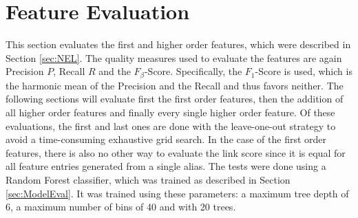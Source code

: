 \section{Feature Evaluation}
\label{sec:FeatureEval}
This section evaluates the first and higher order features, which were described in Section \ref{sec:NEL}. The quality measures used to evaluate the features are again Precision $P$, Recall $R$ and the $F_{\beta}$-Score. Specifically, the $F_1$-Score is used, which is the harmonic mean of the Precision and the Recall and thus favors neither. The following sections will evaluate first the first order features, then the addition of all higher order features and finally every single higher order feature. Of these evaluations, the first and last ones are done with the leave-one-out strategy to avoid a time-consuming exhaustive grid search. In the case of the first order features, there is also no other way to evaluate the link score since it is equal for all feature entries generated from a single alias. The tests were done using a Random Forest classifier, which was trained as described in Section \ref{sec:ModelEval}. It was trained using these parameters: a maximum tree depth of 6, a maximum number of bins of 40 and with 20 trees.

